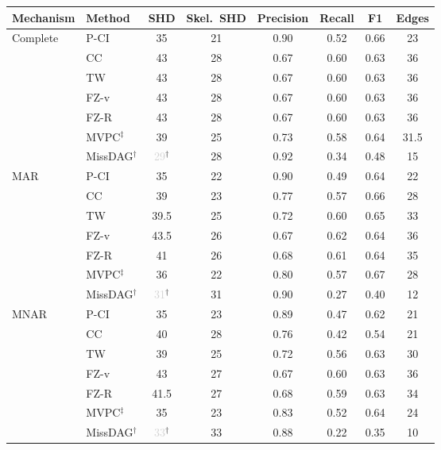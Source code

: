 \begin{tabular}{llcccccc}
    \toprule
    Mechanism & Method & SHD & Skel.\ SHD & Precision & Recall & F1 & Edges \\
    \midrule
    Complete  & P-CI               & 35 & 21 & 0.90 & 0.52 & 0.66 & 23 \\
              & CC                 & 43 & 28 & 0.67 & 0.60 & 0.63 & 36 \\
              & TW                 & 43 & 28 & 0.67 & 0.60 & 0.63 & 36 \\
              & FZ-v               & 43 & 28 & 0.67 & 0.60 & 0.63 & 36 \\
              & FZ-R               & 43 & 28 & 0.67 & 0.60 & 0.63 & 36 \\
              & MVPC$^\ddagger$    & 39 & 25 & 0.73 & 0.58 & 0.64 & 31.5 \\
              & MissDAG$^\dagger$  & \textcolor{lightgray}{29}$^\dagger$ & 28 & 0.92 & 0.34 & 0.48 & 15 \\
    \midrule
    MAR       & P-CI               & 35 & 22 & 0.90 & 0.49 & 0.64 & 22 \\
              & CC                 & 39 & 23 & 0.77 & 0.57 & 0.66 & 28 \\
              & TW                 & 39.5 & 25 & 0.72 & 0.60 & 0.65 & 33 \\
              & FZ-v               & 43.5 & 26 & 0.67 & 0.62 & 0.64 & 36 \\
              & FZ-R               & 41 & 26 & 0.68 & 0.61 & 0.64 & 35 \\
              & MVPC$^\ddagger$    & 36 & 22 & 0.80 & 0.57 & 0.67 & 28 \\
              & MissDAG$^\dagger$  & \textcolor{lightgray}{31}$^\dagger$ & 31 & 0.90 & 0.27 & 0.40 & 12 \\
    \midrule
    MNAR      & P-CI               & 35 & 23 & 0.89 & 0.47 & 0.62 & 21 \\
              & CC                 & 40 & 28 & 0.76 & 0.42 & 0.54 & 21 \\
              & TW                 & 39 & 25 & 0.72 & 0.56 & 0.63 & 30 \\
              & FZ-v               & 43 & 27 & 0.67 & 0.60 & 0.63 & 36 \\
              & FZ-R               & 41.5 & 27 & 0.68 & 0.59 & 0.63 & 34 \\
              & MVPC$^\ddagger$    & 35 & 23 & 0.83 & 0.52 & 0.64 & 24 \\
              & MissDAG$^\dagger$  & \textcolor{lightgray}{33}$^\dagger$ & 33 & 0.88 & 0.22 & 0.35 & 10 \\

\end{tabular}
